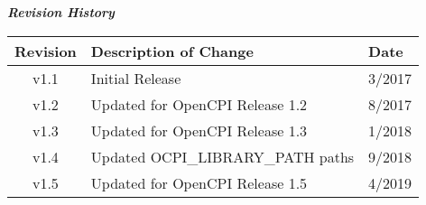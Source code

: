 \iffalse
This file is protected by Copyright. Please refer to the COPYRIGHT file
distributed with this source distribution.

This file is part of OpenCPI <http://www.opencpi.org>

OpenCPI is free software: you can redistribute it and/or modify it under the
terms of the GNU Lesser General Public License as published by the Free Software
Foundation, either version 3 of the License, or (at your option) any later
version.

OpenCPI is distributed in the hope that it will be useful, but WITHOUT ANY
WARRANTY; without even the implied warranty of MERCHANTABILITY or FITNESS FOR A
PARTICULAR PURPOSE. See the GNU Lesser General Public License for more details.

You should have received a copy of the GNU Lesser General Public License along
with this program. If not, see <http://www.gnu.org/licenses/>.
\fi

\def\docTitle{FSK App Getting Started Guide}
\def\snippetpath{../../../../../doc/av/tex/snippets}



\maketitle
\thispagestyle{empty}
\newpage

	\begin{center}
	\textit{\textbf{Revision History}}
		\begin{table}[H]
		\label{table:revisions} %
			\begin{tabularx}{\textwidth}{|c|X|l|}
			\hline
			\rowcolor{blue}
			\textbf{Revision} & \textbf{Description of Change} & \textbf{Date} \\
		    \hline
		    v1.1 & Initial Release & 3/2017 \\
		    \hline
		    v1.2 & Updated for OpenCPI Release 1.2 & 8/2017 \\
			\hline
			v1.3 & Updated for OpenCPI Release 1.3 & 1/2018 \\
			\hline
			v1.4 & Updated OCPI\_LIBRARY\_PATH paths & 9/2018 \\
			\hline
			v1.5 & Updated for OpenCPI Release 1.5 & 4/2019 \\
			\hline
			\end{tabularx}
		\end{table}
	\end{center}

